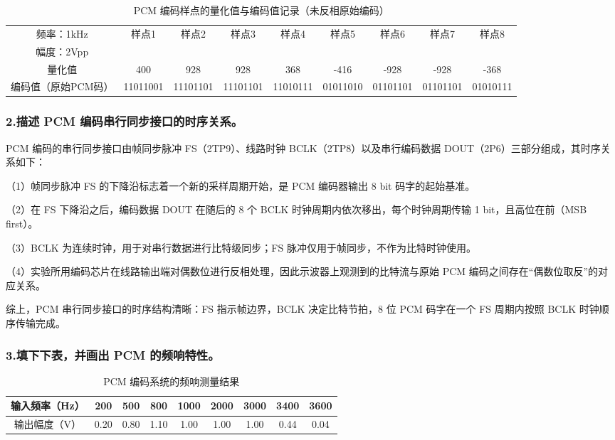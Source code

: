 \documentclass{xjtureport}
\begin{document}
\begin{table}[H]
	\centering
	\small
	\begin{tabular}{|c|cccccccc|}
		\hline
		频率：1kHz & 样点1 & 样点2 & 样点3 & 样点4 & 样点5 & 样点6 & 样点7 & 样点8 \\
		幅度：2Vpp &       &       &       &       &       &       &       &       \\
		\hline
		量化值     & 400 & 928 & 928 & 368 & -416 & -928 & -928 & -368 \\
		\hline
		编码值（原始PCM码） & 
		11011001 &
		11101101 &
		11101101 &
		11010111 &
		01011010 &
		01101101 &
		01101101 &
		01010111 \\
		\hline
	\end{tabular}
	\caption{PCM 编码样点的量化值与编码值记录（未反相原始编码）}
\end{table}

\subsubsection*{2.描述 PCM 编码串行同步接口的时序关系。}

PCM 编码的串行同步接口由帧同步脉冲 FS（2TP9）、线路时钟 BCLK（2TP8）以及串行编码数据 DOUT（2P6）三部分组成，其时序关系如下：

（1）帧同步脉冲 FS 的下降沿标志着一个新的采样周期开始，是 PCM 编码器输出 8 bit 码字的起始基准。

（2）在 FS 下降沿之后，编码数据 DOUT 在随后的 8 个 BCLK 时钟周期内依次移出，每个时钟周期传输 1 bit，且高位在前（MSB first）。

（3）BCLK 为连续时钟，用于对串行数据进行比特级同步；FS 脉冲仅用于帧同步，不作为比特时钟使用。

（4）实验所用编码芯片在线路输出端对偶数位进行反相处理，因此示波器上观测到的比特流与原始 PCM 编码之间存在“偶数位取反”的对应关系。

综上，PCM 串行同步接口的时序结构清晰：FS 指示帧边界，BCLK 决定比特节拍，8 位 PCM 码字在一个 FS 周期内按照 BCLK 时钟顺序传输完成。

\subsubsection*{3.填下下表，并画出 PCM 的频响特性。}

\begin{table}[H]
	\centering
	\begin{tabular}{|c|cccccccc|}
		\hline
		输入频率（Hz） & 200 & 500 & 800 & 1000 & 2000 & 3000 & 3400 & 3600 \\
		\hline
		输出幅度（V） & 0.20 & 0.80 & 1.10 & 1.00 & 1.00 & 1.00 & 0.44 & 0.04 \\
		\hline
	\end{tabular}
	\caption{PCM 编码系统的频响测量结果}
\end{table}
\end{document}
